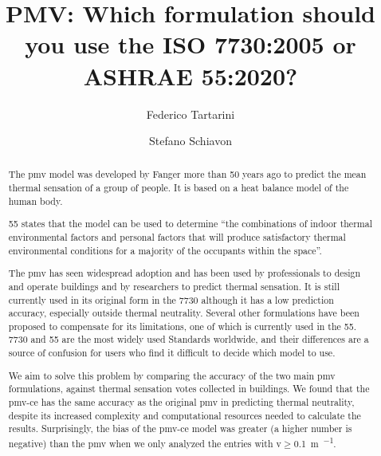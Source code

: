 \begin{frontmatter}

    \title{PMV: Which formulation should you use the ISO 7730:2005 or ASHRAE 55:2020?}

    \author[label1,label2]{Federico Tartarini}
    \author[label3]{Stefano Schiavon}

    \address[label1]{Berkeley Education Alliance for Research in Singapore, Singapore}
    \address[label2]{Heat and Health Research Incubator, Faculty of Health and Medicine, University of Sydney, Sydney, AU}
    \address[label3]{Center for the Built Environment, University of California, Berkeley, CA, USA}


    \begin{abstract}
        The \ac{pmv} model was developed by Fanger more than 50 years ago to predict the mean thermal sensation of a group of people. 
        It is based on a heat balance model of the human body.

        \gls{55} states that the model can be used to determine ``the combinations of indoor thermal environmental factors and personal factors that will produce satisfactory thermal environmental conditions for a majority of the occupants within the space''.

        The \ac{pmv} has seen widespread adoption and has been used by professionals to design and operate buildings and by researchers to predict thermal sensation.
        It is still currently used in its original form in the \gls{7730} although it has a low prediction accuracy, especially outside thermal neutrality.
        Several other formulations have been proposed to compensate for its limitations, one of which is currently used in the \gls{55}.
        \gls{7730} and \gls{55} are the most widely used Standards worldwide, and their differences are a source of confusion for users who find it difficult to decide which model to use.

        We aim to solve this problem by comparing the accuracy of the two main \ac{pmv} formulations, against  thermal sensation votes collected in buildings.
        We found that the \ac{pmv-ce} has the same accuracy as the original \ac{pmv} in predicting thermal neutrality, despite its increased complexity and computational resources needed to calculate the results.
        Surprisingly, the bias of the \ac{pmv-ce} model was greater (a higher number is negative) than the \ac{pmv} when we only analyzed the entries with \ac{v}$\geq$\qty{0.1}{\m\per\sec}.


\end{abstract}
\end{frontmatter}
